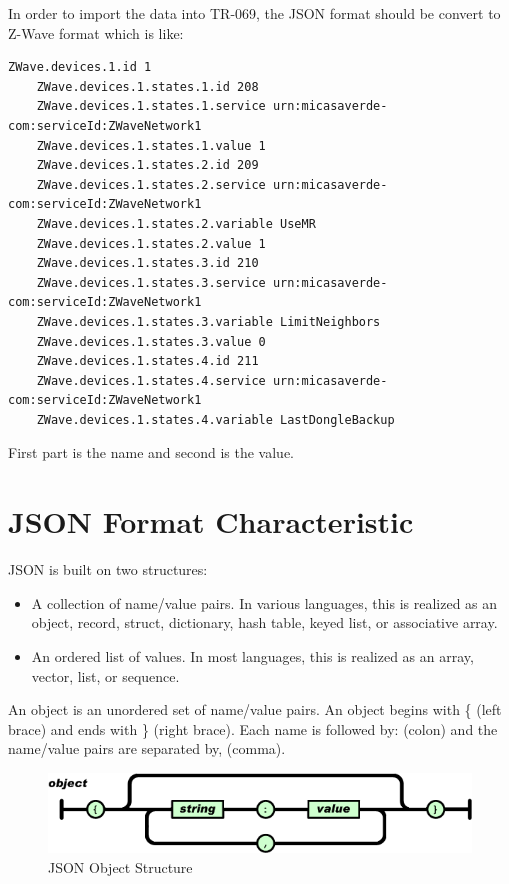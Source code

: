 In order to import the data into TR-069, the JSON format should be convert to Z-Wave format which is like:
\begin{lstlisting}[mathescape]
    ZWave.devices.1.id 1
    ZWave.devices.1.states.1.id 208
    ZWave.devices.1.states.1.service urn:micasaverde-com:serviceId:ZWaveNetwork1
    ZWave.devices.1.states.1.value 1
    ZWave.devices.1.states.2.id 209
    ZWave.devices.1.states.2.service urn:micasaverde-com:serviceId:ZWaveNetwork1
    ZWave.devices.1.states.2.variable UseMR
    ZWave.devices.1.states.2.value 1
    ZWave.devices.1.states.3.id 210
    ZWave.devices.1.states.3.service urn:micasaverde-com:serviceId:ZWaveNetwork1
    ZWave.devices.1.states.3.variable LimitNeighbors
    ZWave.devices.1.states.3.value 0
    ZWave.devices.1.states.4.id 211
    ZWave.devices.1.states.4.service urn:micasaverde-com:serviceId:ZWaveNetwork1
    ZWave.devices.1.states.4.variable LastDongleBackup
\end{lstlisting}

First part is the name and second is the value.
\section{JSON Format Characteristic}
JSON is built on two structures:

\begin{itemize}
  \item A collection of name/value pairs. In various languages, this is realized as an object, record, struct, dictionary, hash table, keyed list, or associative array.
  \item An ordered list of values. In most languages, this is realized as an array, vector, list, or sequence.
\end{itemize}
An object is an unordered set of name/value pairs. An object begins with \{ (left brace) and ends with \} (right brace). Each name is followed by: (colon) and the name/value pairs are separated by, (comma).

\begin{figure}[htbp]
	\centering
		\includegraphics[width=12cm]{Figures/jsonobject.png}
	\caption[JSON Object Structure]{JSON Object Structure}
\end{figure}

